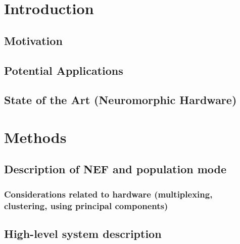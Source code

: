 \documentclass[english]{article}
\begin{document}
\lstset{basicstyle=\footnotesize}

\section{Introduction}

\subsection{Motivation}

\subsection{Potential Applications}

\subsection{State of the Art (Neuromorphic Hardware)}

\section{Methods}

\subsection{Description of NEF and population mode}

\subsubsection{Considerations related to hardware (multiplexing, clustering, using principal components)}

\subsection{High-level system description}
\end{document}
